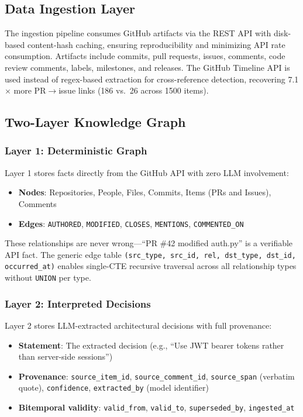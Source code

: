 \documentclass[conference]{IEEEtran}
\begin{document}
\subsection{Data Ingestion Layer}
The ingestion pipeline consumes GitHub artifacts via the REST API with disk-based content-hash caching, ensuring reproducibility and minimizing API rate consumption. Artifacts include commits, pull requests, issues, comments, code review comments, labels, milestones, and releases. The GitHub Timeline API is used instead of regex-based extraction for cross-reference detection, recovering 7.1$\times$ more PR$\rightarrow$issue links (186 vs.\ 26 across 1500 items).

\subsection{Two-Layer Knowledge Graph}

\subsubsection{Layer 1: Deterministic Graph}
Layer 1 stores facts directly from the GitHub API with zero LLM involvement:
\begin{itemize}
    \item \textbf{Nodes}: Repositories, People, Files, Commits, Items (PRs and Issues), Comments
    \item \textbf{Edges}: \texttt{AUTHORED}, \texttt{MODIFIED}, \texttt{CLOSES}, \texttt{MENTIONS}, \texttt{COMMENTED\_ON}
\end{itemize}
These relationships are never wrong---``PR \#42 modified auth.py'' is a verifiable API fact. The generic edge table \texttt{(src\_type, src\_id, rel, dst\_type, dst\_id, occurred\_at)} enables single-CTE recursive traversal across all relationship types without \texttt{UNION} per type.

\subsubsection{Layer 2: Interpreted Decisions}
Layer 2 stores LLM-extracted architectural decisions with full provenance:
\begin{itemize}
    \item \textbf{Statement}: The extracted decision (e.g., ``Use JWT bearer tokens rather than server-side sessions'')
    \item \textbf{Provenance}: \texttt{source\_item\_id}, \texttt{source\_comment\_id}, \texttt{source\_span} (verbatim quote), \texttt{confidence}, \texttt{extracted\_by} (model identifier)
    \item \textbf{Bitemporal validity}: \texttt{valid\_from}, \texttt{valid\_to}, \texttt{superseded\_by}, \texttt{ingested\_at}
\end{itemize}
\end{document}
